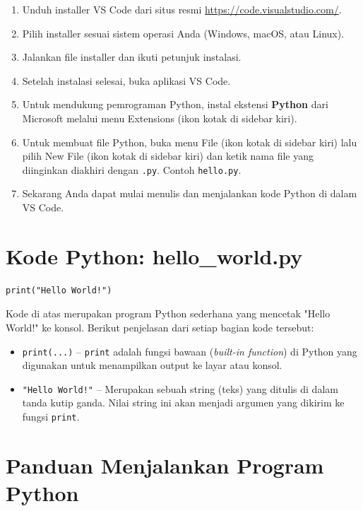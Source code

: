 \begin{enumerate}
    \item Unduh installer VS Code dari situs resmi \url{https://code.visualstudio.com/}.
    \item Pilih installer sesuai sistem operasi Anda (Windows, macOS, atau Linux).
    \item Jalankan file installer dan ikuti petunjuk instalasi.
    \item Setelah instalasi selesai, buka aplikasi VS Code.
    \item Untuk mendukung pemrograman Python, instal ekstensi \textbf{Python} dari Microsoft melalui menu Extensions (ikon kotak di sidebar kiri).
    \item Untuk membuat file Python, buka menu File (ikon kotak di sidebar kiri) lalu pilih New File (ikon kotak di sidebar kiri) dan ketik nama file yang diinginkan diakhiri dengan \texttt{.py}. Contoh \texttt{hello.py}.
    \item Sekarang Anda dapat mulai menulis dan menjalankan kode Python di dalam VS Code.
\end{enumerate}

\section{Kode Python: hello_world.py}
\label{sec:hello-world-code}

\begin{lstlisting}[style=PythonStyle, caption={Kode Python: hello_world.py}]
print("Hello World!")
\end{lstlisting}

Kode di atas merupakan program Python sederhana yang mencetak "Hello World!" ke konsol. Berikut penjelasan dari setiap bagian kode tersebut:

\begin{itemize}
\item \texttt{print(...)} – \texttt{print} adalah fungsi bawaan (\textit{built-in function}) di Python yang digunakan untuk menampilkan output ke layar atau konsol.
\item \texttt{"Hello World!"} – Merupakan sebuah string (teks) yang ditulis di dalam tanda kutip ganda. Nilai string ini akan menjadi argumen yang dikirim ke fungsi \texttt{print}.
\end{itemize}

\section{Panduan Menjalankan Program Python}

